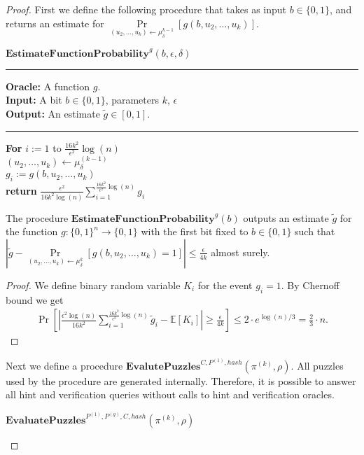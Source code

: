 \begin{proof}
%
First we define the following procedure that takes as input $b \in \{0,1\}$, and returns
an estimate for $\underset{(u_2, \dots, u_k) \leftarrow \mu_{\delta}^{k-1}}{\Pr}[g(b,u_2, \dots, u_k )]$.
%
\begin{codeblock}
  $\textbf{EstimateFunctionProbability}^{g}(b, \epsilon, \delta)$
  \medskip
  \hrule
  \medskip
  \textbf{Oracle:} A function $g$.\\
  \textbf{Input:} A bit $b \in \{0,1\}$, parameters $k$, $\epsilon$ \\
  \textbf{Output:} An estimate $\widetilde{g} \in \left[0,1\right]$.
  \medskip\hrule\medskip
  \textbf{For} $i:=1$ to $\frac{16k^2}{\epsilon^2}\log(n)$ \Do \\
  \IndI $(u_2, \dots, u_k) \leftarrow \mu_{\delta}^{(k-1)}$ \\
  \IndI $g_i := g(b, u_2, \dots, u_k)$ \then \\
  \textbf{return} $\frac{\epsilon^2}{16k^2\log(n)} \sum_{i=1}^{\frac{16k^2}{\epsilon^2}\log(n)} g_i$
\end{codeblock}
%
\begin{lemma}
  \label{lemma:estimate_of_g}
  The procedure $\textbf{EstimateFunctionProbability}^g(b)$ outputs an estimate $\widetilde{g}$
  for the function $g: \{0,1\}^{n} \rightarrow \{0,1\}$ with the first bit fixed to $b \in \{0,1\}$
  such that $| \widetilde{g} - \underset{(u_2,\dots,u_k) \leftarrow \mu_{\delta}^{k}}{\Pr}\left[g(b,u_2, \dots, u_k) = 1\right] | \leq \frac{\epsilon}{4k}$ almost surely.
\end{lemma}
%
\begin{proof}
We define binary random variable $K_i$ for the event $g_i = 1$. By Chernoff bound we get
\begin{align*}
  \underset{}{\Pr}\left[\left|\frac{\epsilon^2 \log(n)}{16k^2} \sum_{i=1}^{\frac{16k^2}{\epsilon^2}\log(n)} \widetilde{g}_i - \mathbb{E}[K_i]\right| \geq \frac{\epsilon}{4k}  \right]
  \leq 2 \cdot e^{\log(n)/3} = \frac{2}{3} \cdot n.
\end{align*}
\end{proof}
%
Next we define a procedure $\textbf{EvalutePuzzles}^{C, P^{(1)}, hash}(\pi^{(k)}, \rho)$.
All puzzles used by the procedure are generated internally.
Therefore, it is possible to answer all hint and verification queries without calls to hint and verification oracles.
%
\begin{codeblock}
  $\textbf{EvaluatePuzzles}^{P^{(1)}, P^{(g)}, C, hash}(\pi^{(k)}, \rho)$

\end{codeblock}
\end{proof}
